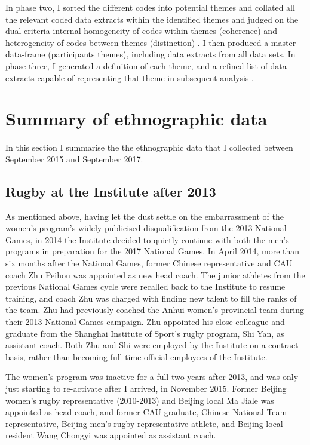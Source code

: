 \begin{CJK}{UTF8}{gbsn}
In phase two, I sorted the different codes into potential themes and collated all the relevant coded data extracts within the identified themes and judged on the dual criteria internal homogeneity of codes within themes (coherence) and heterogeneity of codes between themes (distinction) \citep{Patton1990}.  I then produced a master data-frame (participants \times themes), including data extracts from all data sets. In phase three, I generated a definition of each theme, and a refined list of data extracts capable of representing that theme in subsequent analysis \citep{Braun2006}.




\section{Summary of ethnographic data}
In this section I summarise the the ethnographic data that I collected between September 2015 and September 2017.

\subsection{Rugby at the Institute after 2013}
As mentioned above, having let the dust settle on the embarrassment of the women's program's widely publicised disqualification from the 2013 National Games, in 2014 the Institute decided to quietly continue with both the men's programs in preparation for the 2017 National Games.  In April 2014, more than six months after the National Games, former Chinese representative and CAU coach Zhu Peihou was appointed as new head coach.  The junior athletes from the previous National Games cycle were recalled back to the Institute to resume training, and coach Zhu was charged with finding new talent to fill the ranks of the team.  Zhu had previously coached the Anhui women's provincial team during their 2013 National Games campaign.  Zhu appointed his close colleague and graduate from the Shanghai Institute of Sport's rugby program, Shi Yan, as assistant coach.  Both Zhu and Shi were employed by the Institute on a contract basis, rather than becoming full-time official employees of the Institute.

The women's program was inactive for a full two years after 2013, and was only just starting to re-activate after I arrived, in November 2015.  Former Beijing women's rugby representative (2010-2013) and Beijing local Ma Jiale was appointed as head coach, and former CAU graduate, Chinese National Team representative, Beijing men's rugby representative athlete, and Beijing local resident Wang Chongyi was appointed as assistant coach.


\end{CJK}
